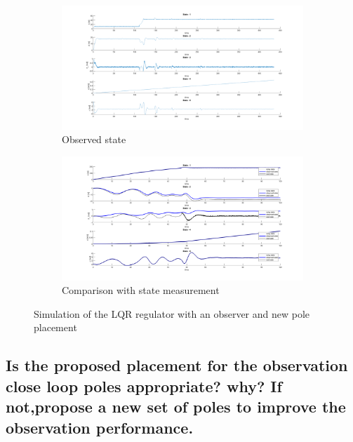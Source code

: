 \begin{figure}[H]
\begin{subfigure}[b]{0.8\textwidth}
         \centering
         \includegraphics[width=\textwidth]{Latex report/image/ex2/state2.png}
         \caption{Observed state}
         \label{fig:2State}
     \end{subfigure}
     \begin{subfigure}[b]{0.8\textwidth}
         \centering
         \includegraphics[width=\textwidth]{Latex report/image/ex2/obs2.png}
         \caption{Comparison with state measurement}
         \label{fig:2Obs}
     \end{subfigure}
    \caption{Simulation of the LQR regulator with an observer and new pole placement}
    \label{fig:sim2}
\end{figure}




\subsection{Is the proposed placement for the observation close loop poles appropriate? why? If not,propose a new set of poles to improve the observation performance.}

